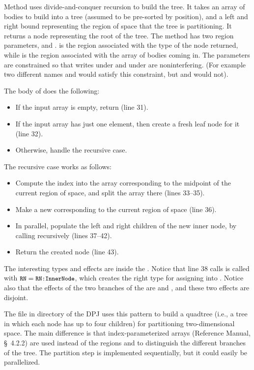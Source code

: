 Method  uses divide-and-conquer recursion to build the
tree.  It takes an array of bodies to build into a tree (assumed to be
pre-sorted by position), and a left and right bound representing the
region of space that the tree is partitioning.  It returns a node
representing the root of the tree.  The method has two region
parameters,  and .   is the region associated
with the type of the node returned, while  is the region
associated with the array of bodies coming in.  The parameters are
constrained so that writes under  and under  are
noninterfering.  (For example two different names  and 
would satisfy this constraint, but  and  would not).

The body of  does the following:
%
\begin{itemize}
%
\item If the input array is empty, return  (line 31).
%
\item If the input array has just one element, then create a fresh
  leaf node for it (line 32).
%
\item Otherwise, handle the recursive case.
%
\end{itemize}

The recursive case works as follows:
%
\begin{itemize}
%
\item Compute the index into the array corresponding to the midpoint
  of the current region of space, and split the array there (lines
  33--35).
%
\item Make a new  corresponding to the current region
  of space (line 36).
%
\item In parallel, populate the left and right children of the new
  inner node, by calling  recursively (lines 37--42).
%
\item Return the created node (line 43).
%
\end{itemize}

The interesting types and effects are inside the .
Notice that line 38 calls  is called with
$\mbox{\small{\texttt{RN}}}=\mbox{\small{\texttt{RN:InnerNode}}}$, which creates the right type for
assigning into .  Notice also that the effects of
the two branches of the  are  and , and these two effects are disjoint.

 The file  in directory
 of the DPJ uses this pattern to build a
quadtree (i.e., a tree in which each node has up to four children)
for partitioning two-dimensional space.  The main difference is that
index-parameterized arrays (Reference Manual, \S~4.2.2) are used
instead of the regions  and  to distinguish
the different branches of the tree.  The partition step is implemented
sequentially, but it could easily be parallelized.

